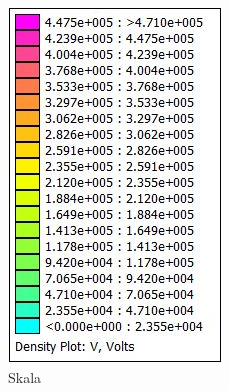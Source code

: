 \begin{figure}[h!]
	\centering
	\begin{subfigure}[h]{.28\textwidth}
		\centering
		\includegraphics[width=\textwidth]{data/Skala}
		\caption{Skala}
		\label{fig:Skala}
	\end{subfigure}
	\begin{subfigure}[h]{.35\textwidth}
		\centering

\end{subfigure}
\end{figure}
